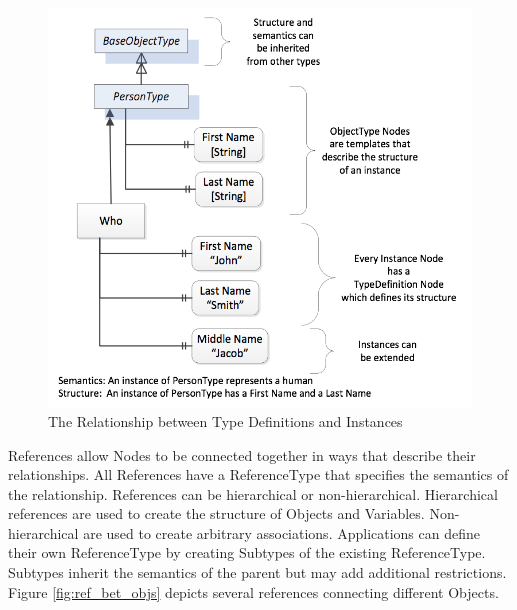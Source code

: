 \begin{figure}[h]
  \centering
  \includegraphics[width=1.0\textwidth]{diagrams/RelsBetweenTypesAndInstances.png}
  \caption{The Relationship between Type Definitions and Instances }
  \label{fig:rel_type_inst}
\end{figure}

References allow Nodes to be connected together in ways that describe their relationships. All References have a ReferenceType that specifies the semantics of the relationship. References can be hierarchical or non-hierarchical. Hierarchical references are used to create the structure of Objects and Variables. Non-hierarchical are used to create arbitrary associations. Applications can define their own ReferenceType by creating Subtypes of the existing ReferenceType. Subtypes inherit the semantics of the parent but may add additional restrictions. Figure \ref{fig:ref_bet_objs} depicts several references connecting different Objects.

